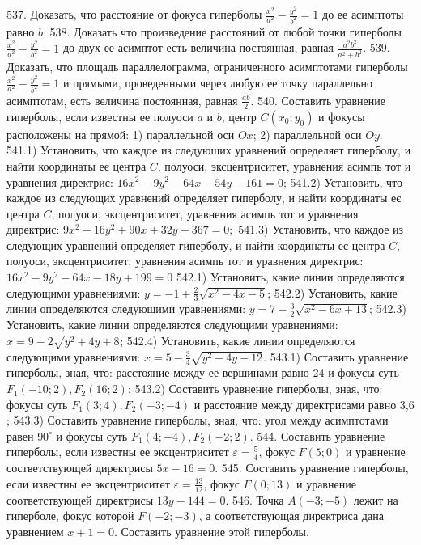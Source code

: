 537. Доказать, что расстояние от фокуса гиперболы $\frac{x^2}{a^2}-\frac{y^2}{b^2}=1$ до ее асимптоты равно $b$.
538. Доказать что произведение расстояний от любой точки гиперболы $\frac{x^2}{a^2}-\frac{y^2}{b^2}=1$ до двух ее асимптот есть величина постоянная, равная $\frac{a^2 b^2}{a^2+b^2}$.
539. Доказать, что площадь параллелограмма, ограниченного асимптотами гиперболы $\frac{x^2}{a^2}-\frac{y^2}{b^2}=1$ и прямыми, проведенными через любую ее точку параллельно асимптотам, есть величина постоянная, равная $\frac{a b}{2}$.
540. Составить уравнение гиперболы, если известны ее полуоси $a$ и $b$, центр $C\left(x_0 ; y_0\right)$ и фокусы расположены на прямой: 1) параллельной оси $O x$; 2) параллельной оси $O y$.
541.1) Установить, что каждое из следующих уравнений определяет гиперболу, и найти координаты еє центра $C$, полуоси, эксцентриситет, уравнения асимпь тот и уравнения директрис: $16 x^2-9 y^2-64 x-54 y-161=0$;
541.2) Установить, что каждое из следующих уравнений определяет гиперболу, и найти координаты еє центра $C$, полуоси, эксцентриситет, уравнения асимпь тот и уравнения директрис: $9 x^2-16 y^2+90 x+32 y-367=0 ;$
541.3) Установить, что каждое из следующих уравнений определяет гиперболу, и найти координаты еє центра $C$, полуоси, эксцентриситет, уравнения асимпь тот и уравнения директрис: $16 x^2-9 y^2-64 x-18 y+199=0$
542.1) Установить, какие линии определяются следующими уравнениями: $y=-1+\frac{2}{3} \sqrt{x^2-4 x-5}$;
542.2) Установить, какие линии определяются следующими уравнениями: $y=7-\frac{3}{2} \sqrt{x^2-6 x+13}$;
542.3) Установить, какие линии определяются следующими уравнениями: $x=9-2 \sqrt{y^2+4 y+8}$;
542.4) Установить, какие линии определяются следующими уравнениями: $x=5-\frac{3}{4} \sqrt{y^2+4 y-12}$.
543.1) Составить уравнение гиперболы, зная, что: расстояние между ее вершинами равно 24 и фокусы суть $F_1(-10 ; 2), F_2(16 ; 2)$;
543.2) Составить уравнение гиперболы, зная, что: фокусы суть $F_1(3 ; 4), F_2(-3 ;-4)$ и расстояние между директрисами равно 3,6 ;
543.3) Составить уравнение гиперболы, зная, что: угол между асимптотами равен $90^{\circ}$ и фокусы суть $F_1(4 ;-4), F_2(-2 ; 2)$.
544. Составить уравнение гиперболы, если известны ее эксцентриситет $\varepsilon=\frac{5}{4}$, фокус $F(5 ; 0)$ и уравнение состветствующей директрисы $5 x-16=0$.
545. Составить уравнение гиперболы, если известны ее эксцентриситет $\varepsilon=\frac{13}{12}$, фокус $F(0 ; 13)$ и уравнение соответствующей директрисы $13 y-144=0$.
546. Точка $A(-3 ;-5)$ лежит на гиперболе, фокус которой $F(-2 ;-3)$, а соответствующая директриса дана уравнением $x+1=0$. Составить уравнение этой гиперболы.
